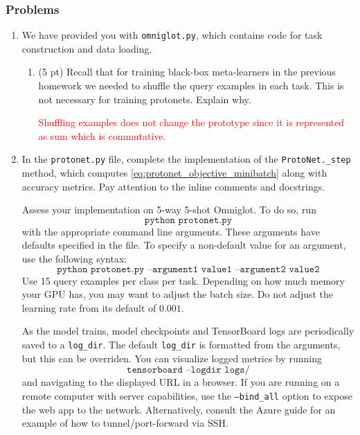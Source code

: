 \documentclass[12pt]{article}
\begin{document}
\subsubsection*{Problems}


\begin{enumerate}
    \item We have provided you with \texttt{omniglot.py}, which contains code for task construction and data loading.
    \begin{enumerate}[label=(\alph*)]
        \item (5 pt) Recall that for training black-box meta-learners in the previous homework we needed to shuffle the query examples in each task. This is not necessary for training protonets. Explain why.
        
        \textcolor{red}{Shuffling examples does not change the prototype since it is represented as sum which is commutative.}
        
    \end{enumerate}
    
    \newpage
    \item In the \texttt{protonet.py} file, complete the implementation of the \texttt{ProtoNet.\_step} method, which computes \eqref{eq:protonet_objective_minibatch} along with accuracy metrics. Pay attention to the inline comments and docstrings.
    
    Assess your implementation on 5-way 5-shot Omniglot. To do so, run 
    \begin{equation*} 
        \texttt{python protonet.py} 
    \end{equation*}
    with the appropriate command line arguments. These arguments have defaults specified in the file. To specify a non-default value for an argument, use the following syntax:
    \begin{equation*}
        \texttt{python protonet.py --argument1 value1 --argument2 value2}
    \end{equation*}
    Use 15 query examples per class per task. Depending on how much memory your GPU has, you may want to adjust the batch size. Do not adjust the learning rate from its default of $0.001$.
    
     As the model trains, model checkpoints and TensorBoard logs are periodically saved to a \texttt{log\_dir}. The default \texttt{log\_dir} is formatted from the arguments, but this can be overriden. You can visualize logged metrics by running
    \begin{equation*}
        \texttt{tensorboard --logdir logs/}
    \end{equation*}
    and navigating to the displayed URL in a browser. If you are running on a remote computer with server capabilities, use the \texttt{--bind\_all} option to expose the web app to the network. Alternatively, consult the Azure guide for an example of how to tunnel/port-forward via SSH.
    

\end{enumerate}
\end{document}
